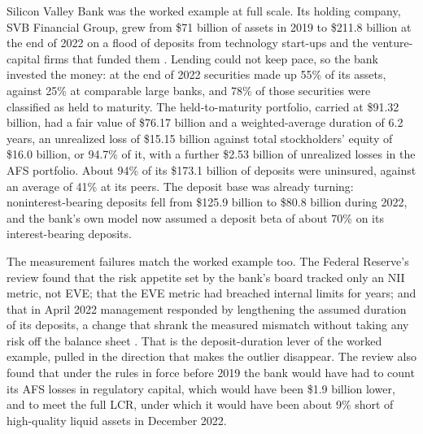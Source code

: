 \documentclass[../ai_in_finance]{subfiles}
\begin{document}
Silicon Valley Bank was the worked example at full scale. Its holding company, SVB Financial Group, grew from \$71 billion of assets in 2019 to \$211.8 billion at the end of 2022 on a flood of deposits from technology start-ups and the venture-capital firms that funded them \parencite{fed2023svbreview,svb2023form10k}. Lending could not keep pace, so the bank invested the money: at the end of 2022 securities made up 55\% of its assets, against 25\% at comparable large banks, and 78\% of those securities were classified as held to maturity. The held-to-maturity portfolio, carried at \$91.32 billion, had a fair value of \$76.17 billion and a weighted-average duration of 6.2 years, an unrealized loss of \$15.15 billion against total stockholders' equity of \$16.0 billion, or 94.7\% of it, with a further \$2.53 billion of unrealized losses in the AFS portfolio. About 94\% of its \$173.1 billion of deposits were uninsured, against an average of 41\% at its peers. The deposit base was already turning: noninterest-bearing deposits fell from \$125.9 billion to \$80.8 billion during 2022, and the bank's own model now assumed a deposit beta of about 70\% on its interest-bearing deposits.

The measurement failures match the worked example too. The Federal Reserve's review found that the risk appetite set by the bank's board tracked only an NII metric, not EVE; that the EVE metric had breached internal limits for years; and that in April 2022 management responded by lengthening the assumed duration of its deposits, a change that shrank the measured mismatch without taking any risk off the balance sheet \parencite{fed2023svbreview}. That is the deposit-duration lever of the worked example, pulled in the direction that makes the outlier disappear. The review also found that under the rules in force before 2019 the bank would have had to count its AFS losses in regulatory capital, which would have been \$1.9 billion lower, and to meet the full LCR, under which it would have been about 9\% short of high-quality liquid assets in December 2022.
\end{document}
